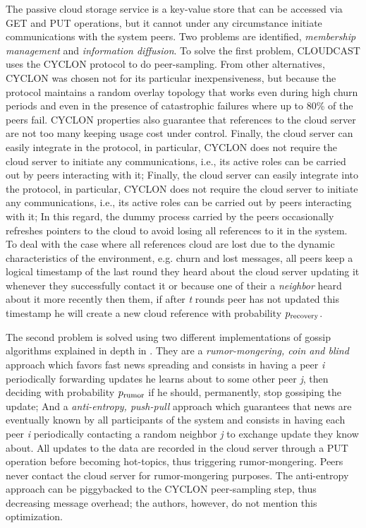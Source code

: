 \documentclass[runningheads]{llncs}
\begin{document}
The passive cloud storage service is a key-value store that can be accessed via GET and PUT operations, but it cannot under any circumstance initiate communications with the system peers. Two problems are identified, \textit{membership management} and \textit{information diffusion}. To solve the first problem, CLOUDCAST uses the CYCLON protocol to do peer-sampling. From other alternatives, CYCLON was chosen not for its particular inexpensiveness, but because the protocol maintains a random overlay topology that works even during high churn periods and even in the presence of catastrophic failures where up to 80\% of the peers fail. CYCLON properties also guarantee that references to the cloud server are not too many keeping usage cost under control. Finally, the cloud server can easily integrate in the protocol, in particular, CYCLON does not require the cloud server to initiate any communications, i.e., its active roles can be carried out by peers interacting with it; Finally, the cloud server can easily integrate into the protocol, in particular, CYCLON does not require the cloud server to initiate any communications, i.e., its active roles can be carried out by peers interacting with it; In this regard, the dummy process carried by the peers occasionally refreshes pointers to the cloud to avoid losing all references to it in the system. To deal with the case where all references cloud are lost due to the dynamic characteristics of the environment, e.g. churn and lost messages, all peers keep a logical timestamp of the last round they heard about the cloud server updating it whenever they successfully contact it or because one of their a \textit{neighbor} heard about it more recently then them, if after \textit{t} rounds peer has not updated this timestamp he will create a new cloud reference with probability $p\textsubscript{recovery}$.

The second problem is solved using two different implementations of gossip algorithms explained in depth in \cite{epidemic_algorithms}. They are a \textit{rumor-mongering, coin and blind} approach which favors fast news spreading and consists in having a peer \textit{i} periodically forwarding updates he learns about to some other peer \textit{j}, then deciding with probability $p\textsubscript{rumor}$ if he should, permanently, stop gossiping the update; And a \textit{anti-entropy, push-pull} approach which guarantees that news are eventually known by all participants of the system and consists in having each peer \textit{i} periodically contacting a random neighbor \textit{j} to exchange update they know about. All updates to the data are recorded in the cloud server through a PUT operation before becoming hot-topics, thus triggering rumor-mongering. Peers never contact the cloud server for rumor-mongering purposes. The anti-entropy approach can be piggybacked to the CYCLON peer-sampling step, thus decreasing message overhead; the authors, however, do not mention this optimization.
\end{document}
